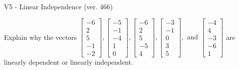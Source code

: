 \begin{exercise}
  \begin{exerciseTitle}V5 - Linear Independence (ver. 466)\end{exerciseTitle}
  \begin{exerciseStatement}
    Explain why the vectors \(\left[\begin{array}{r}
-6 \\
2 \\
5 \\
-1 \\
-2
\end{array}\right] , \left[\begin{array}{r}
-5 \\
-1 \\
-4 \\
1 \\
0
\end{array}\right] , \left[\begin{array}{r}
-6 \\
2 \\
5 \\
-5 \\
4
\end{array}\right] , \left[\begin{array}{r}
-3 \\
-1 \\
0 \\
3 \\
5
\end{array}\right] , \text{ and } \left[\begin{array}{r}
-4 \\
4 \\
-3 \\
-6 \\
1
\end{array}\right]\) are linearly dependent or linearly independent.	



\end{exerciseStatement}
\end{exercise}
